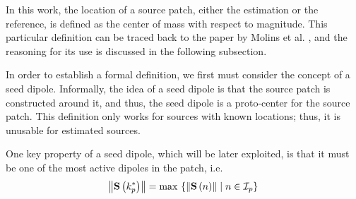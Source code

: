 

%
%

%
%

In this work, the location of a source patch, either the estimation or the reference, is defined as the center of mass with respect to magnitude.
%
%
This particular definition can be traced back to the paper by Molins et al. \cite{molins2008quantification}, and the reasoning for its use is discussed in the following subsection.

In order to establish a formal definition, we first must consider the concept of a seed dipole.
%
Informally, the idea of a seed dipole is that the source patch is constructed around it, and thus, the seed dipole is a proto-center for the source patch.
%
This definition only works for sources with known locations; thus, it is unusable for estimated sources.

One key property of a seed dipole, which will be later exploited, is that it must be one of the most active dipoles in the patch, i.e.
\begin{equation}
    \left\lVert \mathbf{S}\left( k_p^* \right) \right\rVert = \max\, 
    \left\{  \left\lVert \mathbf{S}\left( n \right) \right\rVert \;\middle|\; n\in \mathcal{I}_p  \right\}
\end{equation}

